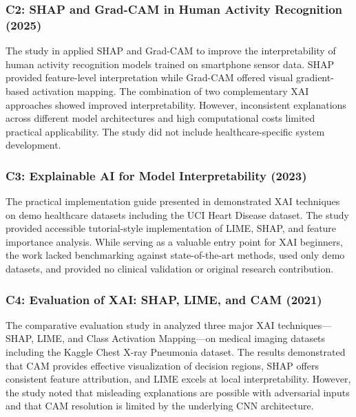 \documentclass[conference]{IEEEtran}
\begin{document}
\subsubsection{C2: SHAP and Grad-CAM in Human Activity Recognition (2025)}

The study in \cite{singaravelu2018prescription} applied SHAP and Grad-CAM to improve the interpretability of human activity recognition models trained on smartphone sensor data. SHAP provided feature-level interpretation while Grad-CAM offered visual gradient-based activation mapping. The combination of two complementary XAI approaches showed improved interpretability. However, inconsistent explanations across different model architectures and high computational costs limited practical applicability. The study did not include healthcare-specific system development.

\subsubsection{C3: Explainable AI for Model Interpretability (2023)}

The practical implementation guide presented in \cite{nguyen2021evaluation} demonstrated XAI techniques on demo healthcare datasets including the UCI Heart Disease dataset. The study provided accessible tutorial-style implementation of LIME, SHAP, and feature importance analysis. While serving as a valuable entry point for XAI beginners, the work lacked benchmarking against state-of-the-art methods, used only demo datasets, and provided no clinical validation or original research contribution.

\subsubsection{C4: Evaluation of XAI: SHAP, LIME, and CAM (2021)}

The comparative evaluation study in \cite{kin2024medical} analyzed three major XAI techniques---SHAP, LIME, and Class Activation Mapping---on medical imaging datasets including the Kaggle Chest X-ray Pneumonia dataset. The results demonstrated that CAM provides effective visualization of decision regions, SHAP offers consistent feature attribution, and LIME excels at local interpretability. However, the study noted that misleading explanations are possible with adversarial inputs and that CAM resolution is limited by the underlying CNN architecture.
\end{document}
